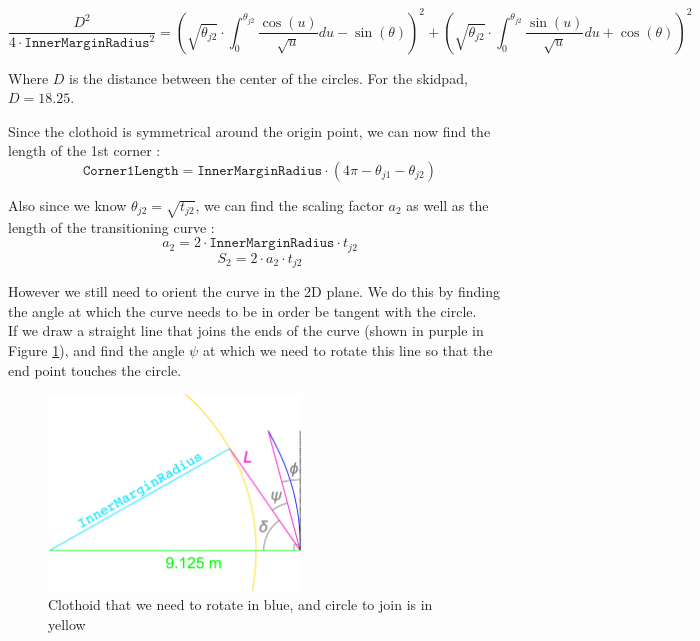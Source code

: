 \documentclass[a4paper, 11pt]{article}
\begin{document}
\begin{equation}
	\frac{D^2}{4\cdot \texttt{InnerMarginRadius}^2} =  \left(\sqrt{\theta_{j2}}\cdot\int_0^{\theta_{j2}}\frac{\cos(u)}{\sqrt{u}}du  - \sin(\theta)\right)^2 +  \left(\sqrt{\theta_{j2}}\cdot\int_0^{\theta_{j2}}\frac{\sin(u)}{\sqrt{u}}du  + \cos(\theta)\right)^2
\end{equation}

Where $D$ is the distance between the center of the circles. For the skidpad, $D = 18.25$.

Since the clothoid is symmetrical around the origin point, we can now find the length of the 1st corner :
\begin{equation}
	\texttt{Corner1Length} = \texttt{InnerMarginRadius}\cdot\left(4\pi - \theta_{j1} - \theta_{j2} \right)
	\label{eq:Corner1Length}
\end{equation}

Also since we know $\theta_{j2} = \sqrt{t_{j2}}$, we can find the scaling factor $a_2$ as well as the length of the transitioning curve :
\begin{equation}
	a_2 = 2 \cdot \texttt{InnerMarginRadius} \cdot t_{j2}
\end{equation}
\begin{equation}
	S_2 = 2 \cdot a_2 \cdot t_{j2}
\end{equation}

However we still need to orient the curve in the 2D plane. We do this by finding the angle at which the curve needs to be in order be tangent with the circle.\\

If we draw a straight line that joins the ends of the curve (shown in purple in Figure \ref{fig:FindAngle}), and find the angle $\psi$ at which we need to rotate this line so that the end point touches the circle.

\begin{figure}[H]
	\centering
	\includegraphics[width = 0.6\textwidth]{Figures/FindAngle.eps}
	\caption{Clothoid that we need to rotate in blue, and circle to join is in yellow}
	\label{fig:FindAngle}
\end{figure}
\end{document}
